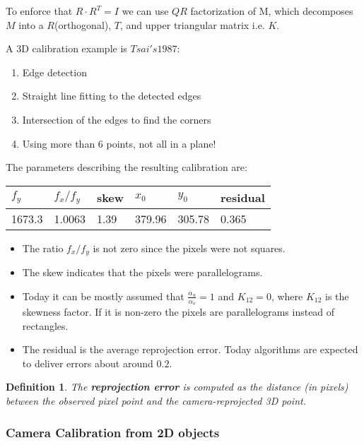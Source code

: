 \documentclass[10pt,a4paper]{scrartcl}
\newtheorem{define}{Definition}
\begin{document}
\begin{multicols*}{2}
To enforce that $R\cdot R^T=I$ we can use $QR$ factorization of M, which decomposes $M$ into a $R$(orthogonal), $T$, and upper triangular matrix i.e. $K$.

\vspace{3ex}

A 3D calibration example is $Tsai's 1987$:

\begin{enumerate}
\item Edge detection
\item Straight line fitting to the detected edges
\item Intersection of the edges to find the corners
\item Using more than 6 points, not all in a plane!
\end{enumerate}

The parameters describing the resulting calibration are:

\begin{center}
\begin{tabular}{|l|l|l|l|l|l|}
$f_y$&$f_x/f_y$&skew&$x_0$&$y_0$&residual\\
\hline\hline
1673.3&1.0063&1.39&379.96&305.78&0.365
\end{tabular}
\end{center}

\begin{itemize}
\item The ratio $f_x/f_y$ is not zero since the pixels were not squares.
\item The skew indicates that the pixels were parallelograms.
\item Today it can be mostly assumed that $\frac{\alpha_u}{\alpha_v}=1$ and $K_{12}=0$, where $K_{12}$ is the skewness factor. If it is non-zero the pixels are parallelograms instead of rectangles. 
\item The residual is the average reprojection error. Today algorithms are expected to deliver errors about around $0.2$.
\end{itemize}

\begin{define}
The \textbf{reprojection error} is computed as the distance (in pixels) between the observed pixel point and the camera-reprojected 3D point.
\end{define}

\subsubsection{Camera Calibration from 2D objects}


\end{multicols*}
\end{document}
